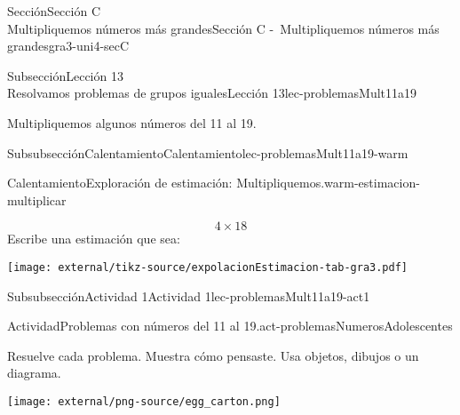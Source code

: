 \begin{sectionptx}{Sección}{{\Large Sección C\\}Multipliquemos números más grandes}{}{Sección C -~Multipliquemos números más grandes}{}{}{gra3-uni4-secC}
%
\typeout{************************************************}
\typeout{************************************************}
%
\begin{subsectionptx}{Subsección}{{\normalsize Lección 13\\[-0.05cm]}Resolvamos problemas de grupos iguales}{}{Lección 13}{}{}{lec-problemasMult11a19}
\begin{introduction}{}%
Multipliquemos algunos números del 11 al 19.%
\end{introduction}%
%
%
\typeout{************************************************}
\typeout{************************************************}
%
\begin{subsubsectionptx}{Subsubsección}{Calentamiento}{}{Calentamiento}{}{}{lec-problemasMult11a19-warm}
\begin{exploration}{Calentamiento}{Exploración de estimación: Multipliquemos.}{warm-estimacion-multiplicar}%
%
\begin{multicols}{2}
\begin{equation*}
4\times 18
\end{equation*}
\vfill\columnbreak
Escribe una estimación que sea:%
\begin{image}{0}{1}{0}{}%
\texttt{[image: external/tikz-source/expolacionEstimacion-tab-gra3.pdf]}
\end{image}%
\end{multicols}
\end{exploration}%
\end{subsubsectionptx}
%
%
\typeout{************************************************}
\typeout{************************************************}
%
\begin{subsubsectionptx}{Subsubsección}{Actividad 1}{}{Actividad 1}{}{}{lec-problemasMult11a19-act1}
\begin{activity}{Actividad}{Problemas con números del 11 al 19.}{act-problemasNumerosAdolescentes}%
\begin{sidebyside}{2}{0.05}{0.05}{0.1}%
\begin{sbspanel}{0.5}%
Resuelve cada problema. Muestra cómo pensaste. Usa objetos, dibujos o un diagrama.%
\end{sbspanel}%
\begin{sbspanel}{0.3}%
\texttt{[image: external/png-source/egg\_carton.png]}
\end{sbspanel}%

\end{sidebyside}
\end{activity}
\end{subsubsectionptx}
\end{subsectionptx}
\end{sectionptx}
